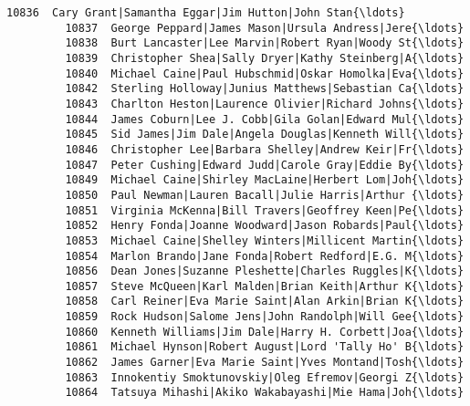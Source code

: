 \documentclass[11pt]{article}
\begin{document}
\begin{Verbatim}[commandchars=\\\{\}]
         10836  Cary Grant|Samantha Eggar|Jim Hutton|John Stan{\ldots}   
         10837  George Peppard|James Mason|Ursula Andress|Jere{\ldots}   
         10838  Burt Lancaster|Lee Marvin|Robert Ryan|Woody St{\ldots}   
         10839  Christopher Shea|Sally Dryer|Kathy Steinberg|A{\ldots}   
         10840  Michael Caine|Paul Hubschmid|Oskar Homolka|Eva{\ldots}   
         10842  Sterling Holloway|Junius Matthews|Sebastian Ca{\ldots}   
         10843  Charlton Heston|Laurence Olivier|Richard Johns{\ldots}   
         10844  James Coburn|Lee J. Cobb|Gila Golan|Edward Mul{\ldots}   
         10845  Sid James|Jim Dale|Angela Douglas|Kenneth Will{\ldots}   
         10846  Christopher Lee|Barbara Shelley|Andrew Keir|Fr{\ldots}   
         10847  Peter Cushing|Edward Judd|Carole Gray|Eddie By{\ldots}   
         10849  Michael Caine|Shirley MacLaine|Herbert Lom|Joh{\ldots}   
         10850  Paul Newman|Lauren Bacall|Julie Harris|Arthur {\ldots}   
         10851  Virginia McKenna|Bill Travers|Geoffrey Keen|Pe{\ldots}   
         10852  Henry Fonda|Joanne Woodward|Jason Robards|Paul{\ldots}   
         10853  Michael Caine|Shelley Winters|Millicent Martin{\ldots}   
         10854  Marlon Brando|Jane Fonda|Robert Redford|E.G. M{\ldots}   
         10856  Dean Jones|Suzanne Pleshette|Charles Ruggles|K{\ldots}   
         10857  Steve McQueen|Karl Malden|Brian Keith|Arthur K{\ldots}   
         10858  Carl Reiner|Eva Marie Saint|Alan Arkin|Brian K{\ldots}   
         10859  Rock Hudson|Salome Jens|John Randolph|Will Gee{\ldots}   
         10860  Kenneth Williams|Jim Dale|Harry H. Corbett|Joa{\ldots}   
         10861  Michael Hynson|Robert August|Lord 'Tally Ho' B{\ldots}   
         10862  James Garner|Eva Marie Saint|Yves Montand|Tosh{\ldots}   
         10863  Innokentiy Smoktunovskiy|Oleg Efremov|Georgi Z{\ldots}   
         10864  Tatsuya Mihashi|Akiko Wakabayashi|Mie Hama|Joh{\ldots}   
         

\end{Verbatim}
\end{document}
